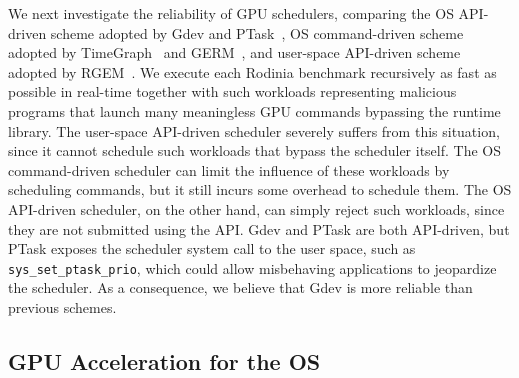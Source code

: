 We next investigate the reliability of GPU schedulers, comparing the OS
API-driven scheme adopted by Gdev and PTask~\cite{Rossbach_SOSP11}, OS
command-driven scheme adopted by TimeGraph~\cite{Kato_ATC11} and
GERM~\cite{Bautin_MCNC08}, and user-space API-driven scheme adopted by
RGEM~\cite{Kato_RTSS11}.
We execute each Rodinia benchmark recursively as fast as possible in
real-time together with such workloads representing malicious programs
that launch many meaningless GPU commands bypassing the runtime library.
The user-space API-driven scheduler severely suffers from this
situation, since it cannot schedule such workloads that bypass the
scheduler itself.
The OS command-driven scheduler can limit the influence of these
workloads by scheduling commands, but it still incurs some overhead to
schedule them.
The OS API-driven scheduler, on the other hand, can simply reject such
workloads, since they are not submitted using the API.
Gdev and PTask are both API-driven, but PTask exposes the scheduler
system call to the user space, such as \texttt{sys\_set\_ptask\_prio},
which could allow misbehaving applications to jeopardize the scheduler.
As a consequence, we believe that Gdev is more reliable than previous
schemes.

\subsection{GPU Acceleration for the OS}

